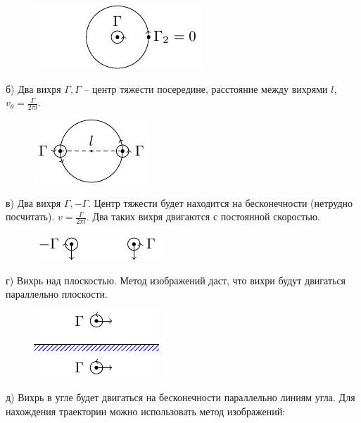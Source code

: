 \begin{figure}[H]
    \centering
    \includegraphics[scale=1.75]{img/oneG}
    \caption{}
    \label{fig:oneG}
\end{figure}

б) Два вихря $\Gamma, \Gamma$ -- центр тяжести посередине, расстояние между вихрями $l$, $v_\theta=\frac{\Gamma}{2\pi l}$.

\begin{figure}[H]
    \centering
    \includegraphics[scale=1.75]{img/twoG}
    \caption{}
    \label{fig:twoG}
\end{figure}

в) Два вихря $\Gamma, -\Gamma$. Центр тяжести будет находится на бесконечности (нетрудно посчитать). $v=\frac{\Gamma}{2\pi l}$. Два таких вихря двигаются с постоянной скоростью.

\begin{figure}[H]
    \centering
    \includegraphics[scale=1.75]{img/3G}
    \caption{}
    \label{fig:3G}
\end{figure}

г) Вихрь над плоскостью. Метод изображений даст, что вихри будут двигаться параллельно плоскости.

\begin{figure}[H]
    \centering
    \includegraphics[scale=1.75]{img/4g1}
    \caption{}
    \label{fig:figure1}
\end{figure}

д) Вихрь в угле будет двигаться на бесконечности параллельно линиям угла. Для нахождения траектории можно использовать метод изображений:

